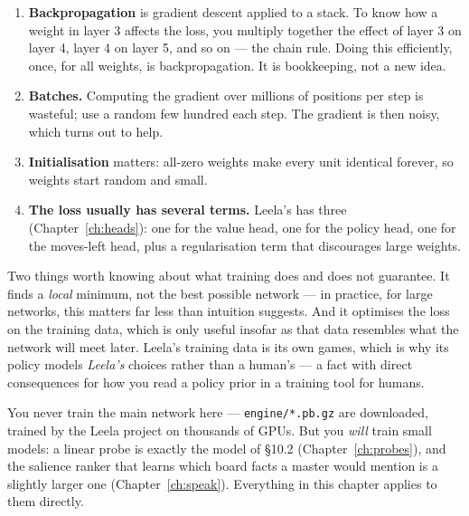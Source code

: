 \begin{enumerate}
\item \textbf{Backpropagation} is gradient descent applied to a stack. To know how a weight in
  layer 3 affects the loss, you multiply together the effect of layer 3 on layer 4, layer 4 on
  layer 5, and so on --- the chain rule. Doing this efficiently, once, for all weights, is
  backpropagation. It is bookkeeping, not a new idea.
\item \textbf{Batches.} Computing the gradient over millions of positions per step is
  wasteful; use a random few hundred each step. The gradient is then noisy, which turns out to
  help.
\item \textbf{Initialisation} matters: all-zero weights make every unit identical forever, so
  weights start random and small.
\item \textbf{The loss usually has several terms.} Leela's has three (Chapter~\ref{ch:heads}):
  one for the value head, one for the policy head, one for the moves-left head, plus a
  regularisation term that discourages large weights.
\end{enumerate}

\begin{established}
Two things worth knowing about what training does and does not guarantee. It finds a
\emph{local} minimum, not the best possible network --- in practice, for large networks, this
matters far less than intuition suggests. And it optimises the loss on the training data,
which is only useful insofar as that data resembles what the network will meet later. Leela's
training data is its own games, which is why its policy models \emph{Leela's} choices rather
than a human's --- a fact with direct consequences for how you read a policy prior in a
training tool for humans.
\end{established}

\begin{repobox}[title={in this repository}]
You never train the main network here --- \texttt{engine/*.pb.gz} are downloaded, trained by
the Leela project on thousands of GPUs. But you \emph{will} train small models: a linear
probe is exactly the model of §10.2 (Chapter~\ref{ch:probes}), and the salience ranker that
learns which board facts a master would mention is a slightly larger one
(Chapter~\ref{ch:speak}). Everything in this chapter applies to them directly.
\end{repobox}

